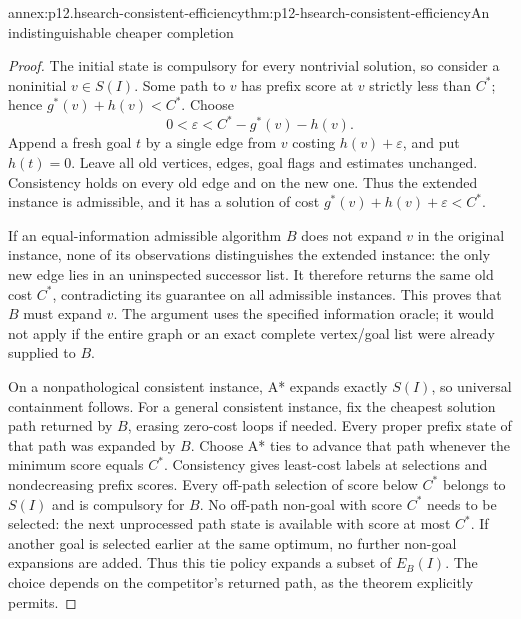 \begin{annexitem}{annex:p12.hsearch-consistent-efficiency}{thm:p12-hsearch-consistent-efficiency}{An indistinguishable cheaper completion}
\begin{proof}
The initial state is compulsory for every nontrivial solution, so consider
a noninitial \(v\in S(I)\). Some path to \(v\) has prefix score
at \(v\) strictly less than \(C^*\); hence
\(g^*(v)+h(v)<C^*\). Choose
\[
 0<\varepsilon<C^*-g^*(v)-h(v).
\]
Append a fresh goal \(t\) by a single edge from \(v\) costing
\(h(v)+\varepsilon\), and put \(h(t)=0\). Leave all old
vertices, edges, goal flags and estimates unchanged. Consistency holds
on every old edge and on the new one. Thus the extended instance is
admissible, and it has a solution of cost
\(g^*(v)+h(v)+\varepsilon<C^*\).

If an equal-information admissible algorithm \(B\) does not expand
\(v\) in the original instance, none of its observations distinguishes
the extended instance: the only new edge lies in an uninspected successor
list. It therefore returns the same old cost \(C^*\), contradicting
its guarantee on all admissible instances. This proves that \(B\)
must expand \(v\). The argument uses the specified information oracle;
it would not apply if the entire graph or an exact complete vertex/goal
list were already supplied to \(B\).

On a nonpathological consistent instance, A* expands exactly \(S(I)\),
so universal containment follows. For a general consistent instance, fix
the cheapest solution path returned by \(B\), erasing zero-cost loops
if needed. Every proper prefix state of that path was expanded by \(B\).
Choose A* ties to advance that path whenever the minimum score equals
\(C^*\). Consistency gives least-cost labels at selections and
nondecreasing prefix scores. Every off-path selection of score below
\(C^*\) belongs to \(S(I)\) and is compulsory for \(B\).
No off-path non-goal with score \(C^*\) needs to be selected: the
next unprocessed path state is available with score at most \(C^*\).
If another goal is selected earlier at the same optimum, no further
non-goal expansions are added. Thus this tie policy expands a subset
of \(E_B(I)\). The choice depends on the competitor's returned path,
as the theorem explicitly permits.
\end{proof}
\end{annexitem}

